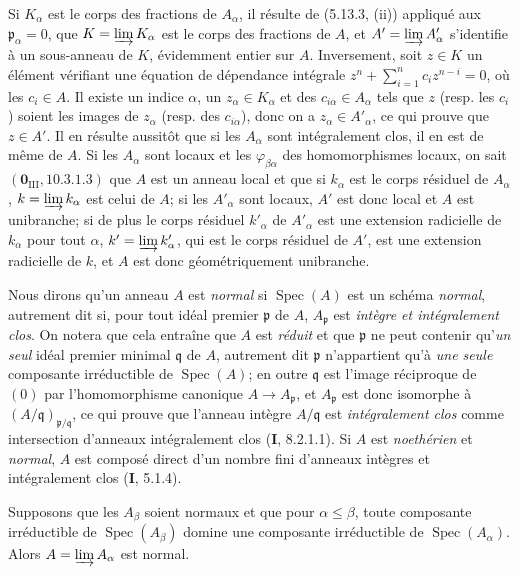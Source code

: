 Si $K_\alpha$ est le corps des fractions de $A_\alpha$, il résulte de (5.13.3,
(ii)) appliqué aux $\mathfrak p_\alpha=0$, que
$K=\varinjlim K_\alpha$ est le corps des fractions de $A$, et
$A'=\varinjlim A'_\alpha$ s'identifie à
un sous-anneau de $K$, évidemment entier sur $A$. Inversement, soit $z\in K$
un élément vérifiant une équation de dépendance intégrale
$z^n+\sum_{i=1}^{n}c_i z^{n-i}=0$,
où les $c_i\in A$. Il existe un indice $\alpha$, un $z_\alpha\in K_\alpha$ et
des $c_{i\alpha}\in A_\alpha$ tels que $z$ (resp. les $c_i$) soient les images
de $z_\alpha$ (resp. des $c_{i\alpha}$), donc on a
$z_\alpha\in A'_\alpha$, ce qui prouve que $z\in A'$. Il en résulte aussitôt
que si les $A_\alpha$ sont intégralement clos, il en est de même de $A$. Si les
$A_\alpha$ sont locaux et les $\varphi_{\beta\alpha}$ des homomorphismes
locaux, on sait $(\mathbf{0}_{\mathrm{III}}, 10.3.1.3)$ que $A$ est un anneau local et
que si $k_\alpha$ est le corps résiduel de $A_\alpha$,
$k=\varinjlim k_\alpha$ est celui de $A$; si les $A'_\alpha$ sont locaux, $A'$
est donc local et $A$ est unibranche; si de plus le corps résiduel
$k'_\alpha$ de $A'_\alpha$ est une extension radicielle de $k_\alpha$ pour
tout $\alpha$, $k'=\varinjlim k'_\alpha$, qui est le corps résiduel de $A'$,
est une extension radicielle de $k$, et $A$ est donc géométriquement
unibranche.

\begin{env}[5.13.5]
\label{IV.2.s5.13.5-fr}
Nous dirons qu'un anneau $A$ est \emph{normal} si
$\operatorname{Spec}(A)$ est un schéma \emph{normal}, autrement dit si, pour tout
idéal premier $\mathfrak p$ de $A$, $A_{\mathfrak p}$ est \emph{intègre et
intégralement clos}. On notera que cela entraîne que $A$ est \emph{réduit} et que
$\mathfrak p$ ne peut contenir qu'\emph{un seul} idéal premier minimal $\mathfrak q$
de $A$, autrement dit $\mathfrak p$ n'appartient qu'à \emph{une seule} composante
irréductible de $\operatorname{Spec}(A)$; en outre $\mathfrak q$ est l'image
réciproque de $(0)$ par l'homomorphisme canonique
$A\to A_{\mathfrak p}$, et $A_{\mathfrak p}$ est donc isomorphe à
$(A/\mathfrak q)_{\mathfrak p/\mathfrak q}$, ce qui prouve que l'anneau
intègre $A/\mathfrak q$ est \emph{intégralement clos} comme intersection d'anneaux
intégralement clos (\textbf{I}, 8.2.1.1). Si $A$ est \emph{noethérien} et \emph{normal}, $A$ est
composé direct d'un nombre fini d'anneaux intègres et intégralement clos (\textbf{I},
5.1.4).
\end{env}

\begin{corollary}[5.13.6]
\label{IV.2.s5.13.6-fr}
Supposons que les $A_\beta$ soient normaux et que pour $\alpha\leq\beta$,
toute composante irréductible de $\operatorname{Spec}(A_\beta)$ domine une
composante irréductible de $\operatorname{Spec}(A_\alpha)$. Alors
$A=\varinjlim A_\alpha$ est normal.
\end{corollary}

